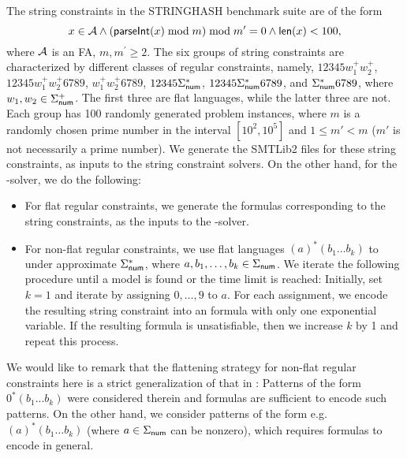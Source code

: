 The string constraints in the STRINGHASH benchmark suite are of the form 
$$x \in \mathcal{A} \wedge \left( \textsf{parseInt}(x) \bmod m \right) \bmod m^\prime = 0   \notag \wedge \textsf{len}(x) < 100,$$ 
where $\mathcal{A}$ is an FA, $m, m^\prime \ge 2.$ 
The six groups of string constraints are characterized by different classes of regular constraints, namely, $12345w^+_1 w^+_2$,  $12345 w^+_1  w^+_2 6789$, $w^+_1 w^+_2 6789$, $12345\Sigma_{\sf num}^*$, $12345\Sigma_{\sf num}^* 6789$, and $\Sigma_{\sf num}^* 6789$, where $w_1,w_2 \in \Sigma^+_{\sf num}$. The first three are flat languages, while the latter three are not. Each group has 100 randomly generated problem instances, where $m$ is a randomly chosen prime number in the interval $[10^2, 10^5]$ and $1 \le m' < m$ ($m'$ is not necessarily a prime number). We generate the SMTLib2 files for these string constraints, as inputs to the string constraint solvers. On the other hand, for the {\paexp}-solver, we do the following:   
\begin{itemize}
\item For flat regular constraints, we generate the {\paexp} formulas corresponding to the string constraints, as the inputs to the {\paexp}-solver.
%
\item For non-flat regular constraints, we use flat languages $(a)^* (b_{1} \ldots b_{k})$ to under approximate 
$\Sigma_{\sf num}^*$,  where $a, b_1,\ldots, b_k \in \Sigma_{\sf num}$. 
%
%
We iterate the following procedure until a model is found or the time limit is reached: Initially, set $k=1$ and iterate by assigning $0, \ldots, 9$ to $a$. For each assignment, we encode the resulting string constraint into an {\paexp} formula with only one exponential variable. If the resulting {\paexp} formula is unsatisfiable, then we increase $k$ by 1 and repeat this process. 
\end{itemize}
We would like to remark that the flattening strategy for non-flat regular constraints here is a strict generalization of that in \cite{Parosh:20:PLDI}: Patterns of the form $0^*(b_1...b_k)$ were considered therein and {\pa} formulas are sufficient to encode such patterns. On the other hand, we consider patterns of the form e.g. $(a)^* (b_1 \ldots b_k)$ (where $a \in \Sigma_{\sf num}$ can be nonzero), which requires {\paexp} formulas to encode in general.


